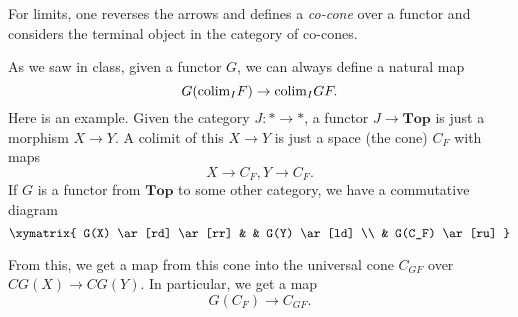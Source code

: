 For limits, one reverses the arrows and defines a \emph{co-cone} over a functor
and considers the terminal object in the category of co-cones.


As we saw in class, given a functor $G$, we can always define a natural map
\[ G(\mathrm{colim}_I F) \to \mathrm{colim}_I GF.  \]
Here is an example. Given the category $J: \ast \to \ast$, a functor $J \to
\mathbf{Top}$ is just a morphism $X \to Y$. A colimit of this $X \to Y$ is just
a space (the cone) $C_F$ with maps 
\[ X \to C_F, Y \to C_F.  \]
If $G$ is a functor from $\mathbf{Top}$ to some other category, we have a
commutative diagram
\[ \xymatrix{
G(X) \ar[rd] \ar[rr] &  &  G(Y) \ar[ld] \\
& G(C_F)  \ar[ru]
}\]
	
From this, we get a map from this cone into the universal cone $C_{GF}$ over
$CG(X) \to CG(Y)$. In particular, we get a map
\[ G(C_F) \to C_{GF}.  \]

